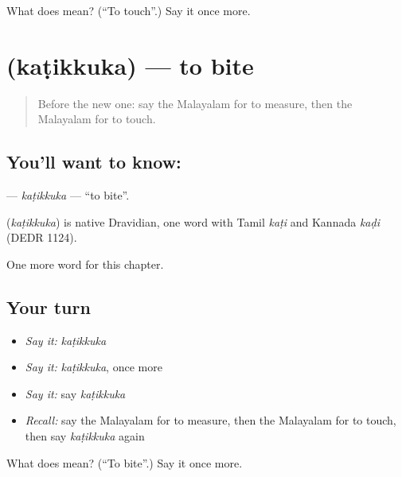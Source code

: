 \begin{tcolorbox}[breakable,colback=teal!4,colframe=teal!35!black,title={Before you move on}]
What does  mean? (\textquotedblleft{}To touch\textquotedblright{}.) Say it once more.
\end{tcolorbox}
\section[\texorpdfstring{\ml{കടിക്കുക} (kaṭikkuka)}{കടിക്കുക (kaṭikkuka)}]{ (kaṭikkuka) — to bite}

\label{lesson:ML-C266-katikkuka}



\begin{quote}
Before the new one: say the Malayalam for to measure, then the Malayalam for to touch.
\end{quote}

\subsection*{You'll want to know: }
\textbf{} — \emph{kaṭikkuka} — \textquotedblleft{}to bite\textquotedblright{}.

\begin{cousinweb}
\textbf{} (\emph{kaṭikkuka}) is native Dravidian, one word with Tamil \emph{kaṭi} and Kannada \emph{kaḍi} (DEDR 1124).
\end{cousinweb}

\begin{grammarlens}[title={What you've built}]
One more word for this chapter.
\end{grammarlens}

\subsection*{Your turn}
\begin{itemize}
\raggedright
  \item \emph{Say it:} \emph{kaṭikkuka}
  \item \emph{Say it:} \emph{kaṭikkuka}, once more
  \item \emph{Say it:} say \emph{kaṭikkuka}
  \item \emph{Recall:} say the Malayalam for to measure, then the Malayalam for to touch, then say \emph{kaṭikkuka} again
\end{itemize}

\begin{tcolorbox}[breakable,colback=teal!4,colframe=teal!35!black,title={Before you move on}]
What does  mean? (\textquotedblleft{}To bite\textquotedblright{}.) Say it once more.
\end{tcolorbox}

